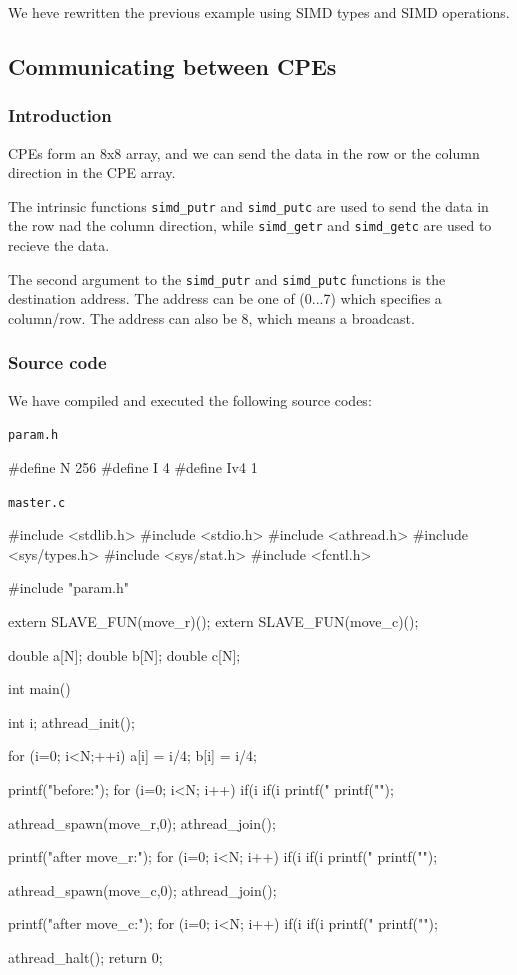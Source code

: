 We heve rewritten the previous example using
SIMD types and SIMD operations.


\subsection{Communicating between CPEs}
\subsubsection{Introduction}

CPEs form an 8x8 array, and
we can send the data in the row or the column direction in the CPE array.

The intrinsic functions
\verb`simd_putr` and
\verb`simd_putc` are used to send the data in the row nad the column direction, while
\verb`simd_getr` and
\verb`simd_getc` are used to recieve the data.

The second argument to the
\verb`simd_putr` and
\verb`simd_putc` functions
is the destination address. The address can be one of
(0...7) which specifies a column/row. The address can also be 8,
which means a broadcast.



\subsubsection{Source code}
 We have compiled and executed the following source codes:

\verb`param.h`
\begin{code}
#define N 256
#define I 4
#define Iv4 1

\end{code}

\verb`master.c`
\begin{code}
#include <stdlib.h>
#include <stdio.h>
#include <athread.h>
#include <sys/types.h>
#include <sys/stat.h>
#include <fcntl.h>

#include "param.h"

extern SLAVE_FUN(move_r)();
extern SLAVE_FUN(move_c)();

double a[N];
double b[N];
double c[N];

int main() {
  int i;
  athread_init();

  for (i=0; i<N;++i){
    a[i] = i/4;
    b[i] = i/4;
  }

  printf("before:");
  for (i=0; i<N; i++){
    if(i%
    if(i%
    printf("%
  }
  printf("\n");

  athread_spawn(move_r,0);
  athread_join();

  printf("after move_r:");
  for (i=0; i<N; i++){
    if(i%
    if(i%
    printf("%
  }
  printf("\n");

  athread_spawn(move_c,0);
  athread_join();

  printf("after move_c:");
  for (i=0; i<N; i++){
    if(i%
    if(i%
    printf("%
  }
  printf("\n");

  athread_halt();
  return 0;
}

\end{code}

